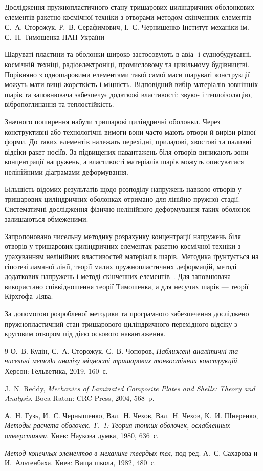 \ReportHeading
  {Дослідження пружнопластичного стану тришарових циліндричних оболонкових елементів ракетно-космічної техніки з отворами методом скінченних елементів}
  {Є.~А. Сторожук, Р.~В. Серафимович, І.~С. Чернишенко}
  {Інститут механіки ім. С.~П. Тимошенка НАН України}
  {}

Шаруваті пластини та оболонки широко застосовують в авіа- і суднобудуванні, космічній техніці, радіоелектроніці, промисловому та цивільному будівництві. Порівняно з одношаровими елементами такої самої маси шаруваті конструкції можуть мати вищі жорсткість і міцність. Відповідний вибір матеріалів зовнішніх шарів та заповнювача забезпечує додаткові властивості: звуко- і теплоізоляцію, вібропоглинання та теплостійкість.

Значного поширення набули тришарові циліндричні оболонки. Через конструктивні або технологічні вимоги вони часто мають отвори й вирізи різної форми. До таких елементів належать перехідні, приладові, хвостові та паливні відсіки ракет-носіїв. За підвищених навантажень біля отворів виникають зони концентрації напружень, а властивості матеріалів шарів можуть описуватися нелінійними діаграмами деформування.

Більшість відомих результатів щодо розподілу напружень навколо отворів у тришарових циліндричних оболонках отримано для лінійно-пружної стадії. Систематичні дослідження фізично нелінійного деформування таких оболонок залишаються обмеженими.

Запропоновано чисельну методику розрахунку концентрації напружень біля отворів у тришарових циліндричних елементах ракетно-космічної техніки з урахуванням нелінійних властивостей матеріалів шарів. Методика ґрунтується на гіпотезі ламаної лінії, теорії малих пружнопластичних деформацій, методі додаткових напружень і методі скінченних елементів~\cite{sandwichholes:kudin2019,sandwichholes:reddy2004,sandwichholes:guz1980,sandwichholes:fem1982}. Для заповнювача використано співвідношення теорії Тимошенка, а для несучих шарів --- теорії Кірхгофа--Лява.

За допомогою розробленої методики та програмного забезпечення досліджено пружнопластичний стан тришарового циліндричного перехідного відсіку з круговим отвором під дією осьового навантаження.

\begin{thebibliography}{9}
О.~В. Кудін, Є.~А. Сторожук, С.~В. Чопоров,
\emph{Наближені аналітичні та чисельні методи аналізу міцності тришарових тонкостінних конструкцій}.
Херсон: Гельветика, 2019, 160~с.

J.~N. Reddy,
\emph{Mechanics of Laminated Composite Plates and Shells: Theory and Analysis}.
Boca Raton: CRC Press, 2004, 568~p.

А.~Н. Гузь, И.~С. Чернышенко, Вал.~Н. Чехов, Вал.~Н. Чехов, К.~И. Шнеренко,
\emph{Методы расчета оболочек. Т.~1: Теория тонких оболочек, ослабленных отверстиями}.
Киев: Наукова думка, 1980, 636~с.

\emph{Метод конечных элементов в механике твердых тел}, под ред. А.~С. Сахарова и И.~Альтенбаха.
Киев: Вища школа, 1982, 480~с.
\end{thebibliography}
